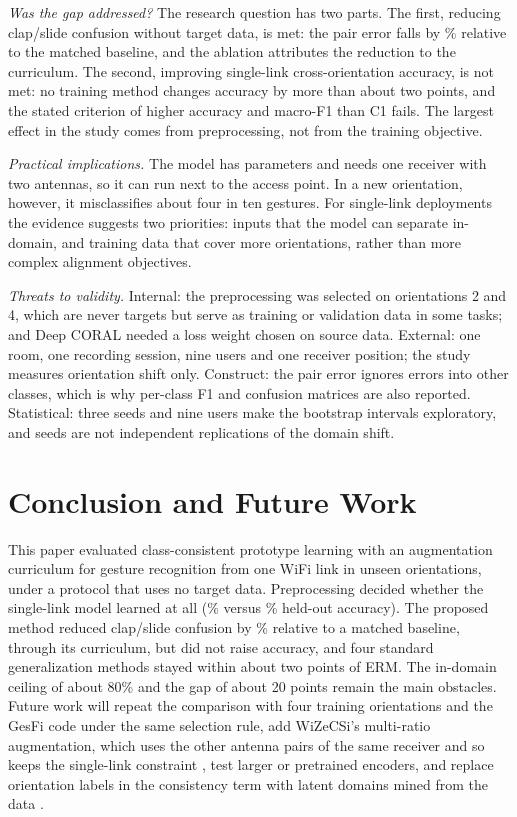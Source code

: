 \documentclass[conference]{IEEEtran}
\begin{document}
\textit{Was the gap addressed?} The research question has two parts. The first, reducing clap/slide confusion without target data, is met: the pair error falls by \CSRelReduction\% relative to the matched baseline, and the ablation attributes the reduction to the curriculum. The second, improving single-link cross-orientation accuracy, is not met: no training method changes accuracy by more than about two points, and the stated criterion of higher accuracy and macro-F1 than C1 fails. The largest effect in the study comes from preprocessing, not from the training objective.

\textit{Practical implications.} The model has \CfiveParams{} parameters and needs one receiver with two antennas, so it can run next to the access point. In a new orientation, however, it misclassifies about four in ten gestures. For single-link deployments the evidence suggests two priorities: inputs that the model can separate in-domain, and training data that cover more orientations, rather than more complex alignment objectives.

\textit{Threats to validity.} Internal: the preprocessing was selected on orientations 2 and 4, which are never targets but serve as training or validation data in some tasks; and Deep CORAL needed a loss weight chosen on source data. External: one room, one recording session, nine users and one receiver position; the study measures orientation shift only. Construct: the pair error ignores errors into other classes, which is why per-class F1 and confusion matrices are also reported. Statistical: three seeds and nine users make the bootstrap intervals exploratory, and seeds are not independent replications of the domain shift.

\section{Conclusion and Future Work}\label{sec:conclusion}
This paper evaluated class-consistent prototype learning with an augmentation curriculum for gesture recognition from one WiFi link in unseen orientations, under a protocol that uses no target data. Preprocessing decided whether the single-link model learned at all (\GateOrig\% versus \GateLocked\% held-out accuracy). The proposed method reduced clap/slide confusion by \CSRelReduction\% relative to a matched baseline, through its curriculum, but did not raise accuracy, and four standard generalization methods stayed within about two points of ERM. The in-domain ceiling of about 80\% and the gap of about 20 points remain the main obstacles. Future work will repeat the comparison with four training orientations and the GesFi code under the same selection rule, add WiZeCSi's multi-ratio augmentation, which uses the other antenna pairs of the same receiver and so keeps the single-link constraint \cite{dai2026wizecsi}, test larger or pretrained encoders, and replace orientation labels in the consistency term with latent domains mined from the data \cite{zhang2026gesfi}.
\end{document}
